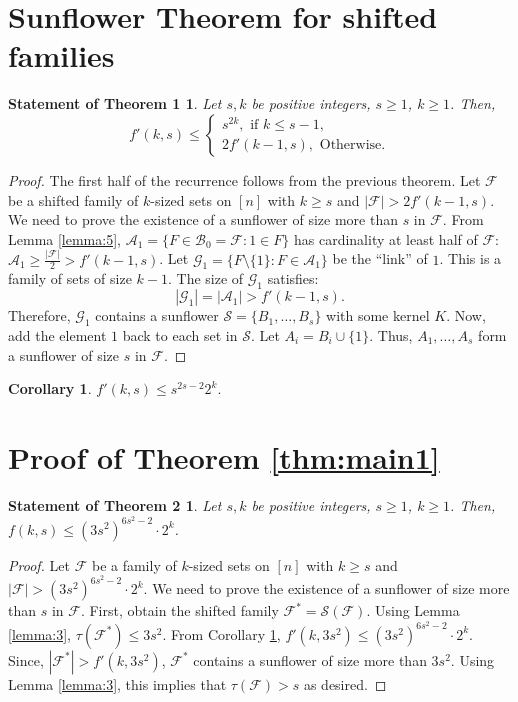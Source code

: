 \documentclass[runningheads,12pt,a4paper]{article}
\newtheorem{corollary}{Corollary}
\newtheorem*{statement}{Statement of Theorem 1}
\newtheorem*{statementA}{Statement of Theorem 2}
\begin{document}
\section{Sunflower Theorem for shifted families}

\begin{statement}
	Let $s,k$ be  positive integers, $s \geq 1$, $k \geq 1$. Then, $$f'(k,s) \leq \begin{cases}
		s^{2k}, \text{ if $k\le s-1$,}\\
		2f'(k-1,s), \text{ Otherwise.}
	\end{cases}$$
\end{statement}

\begin{proof}
	The first half of the recurrence follows from the previous theorem.
	Let $\mathcal{F}$ be a shifted family of $k$-sized sets on $[n]$ with $k\geq s$ and $|\mathcal{F}| > 2f'(k-1,s)$. We need to prove the existence of a sunflower of size more than $s$ in $\mathcal{F}$. From Lemma \ref{lemma:5},
	$\mathcal{A}_1=\{F \in \mathcal{B}_{0}=\mathcal{F} : 1 \in F\}$ has cardinality at least half of $\mathcal{F}$:
	$\mathcal{A}_1 \geq \frac{|\mathcal{F}|}{2}>f'(k-1,s)$.
	Let $\mathcal{G}_1 = \{ F \setminus \{1\} : F \in \mathcal{A}_1\}$ be the ``link'' of $1$. This is a family of sets of size $k-1$. The size of $\mathcal{G}_1$ satisfies:$$|\mathcal{G}_1| =|\mathcal{A}_1| >f'(k-1,s).$$ 
	Therefore, $\mathcal{G}_1$ contains a sunflower $\mathcal{S} = \{B_1, \dots, B_{s}\}$ with some kernel $K$.
	Now, add the element $1$ back to each set in $\mathcal{S}$. Let $A_i = B_i \cup \{1\}$. Thus, $A_1, \dots, A_{s}$ form a sunflower of size $s$ in $\mathcal{F}$.
\end{proof}

\begin{corollary}\label{cor:1}
	$f'(k,s) \leq s^{2s-2}2^{k}.$
\end{corollary}	

\section{Proof of Theorem \ref{thm:main1}}
\label{sec:main}

\begin{statementA}
	Let $s,k$ be  positive integers, $s \geq 1$, $k \geq 1$. Then, $f(k,s) \leq (3s^2)^{6s^2-2} \cdot 2^{k}$.
\end{statementA}

\begin{proof}
	Let $\mathcal{F}$ be a family of $k$-sized sets on $[n]$ with $k\geq s$ and $|\mathcal{F}| > (3s^2)^{6s^2-2} \cdot 2^{k}$. We need to prove the existence of a sunflower of size more than $s$ in $\mathcal{F}$.
	First, obtain the shifted family $\mathcal{F}^*=\mathcal{S}(\mathcal F)$. Using Lemma \ref{lemma:3}, $\tau(\mathcal{F}^*) \leq 3s^2$.
	From Corollary \ref{cor:1}, $f'(k,3s^2) \leq (3s^2)^{6s^2-2} \cdot 2^{k}.$ Since, $|\mathcal{F}^*| > f'(k,3s^2)$, 
	$\mathcal{F}^*$ contains a sunflower of size more than $3s^2$.
	Using Lemma \ref{lemma:3}, this implies that $\tau(\mathcal{F}) > s$ as desired.
\end{proof}
\end{document}

